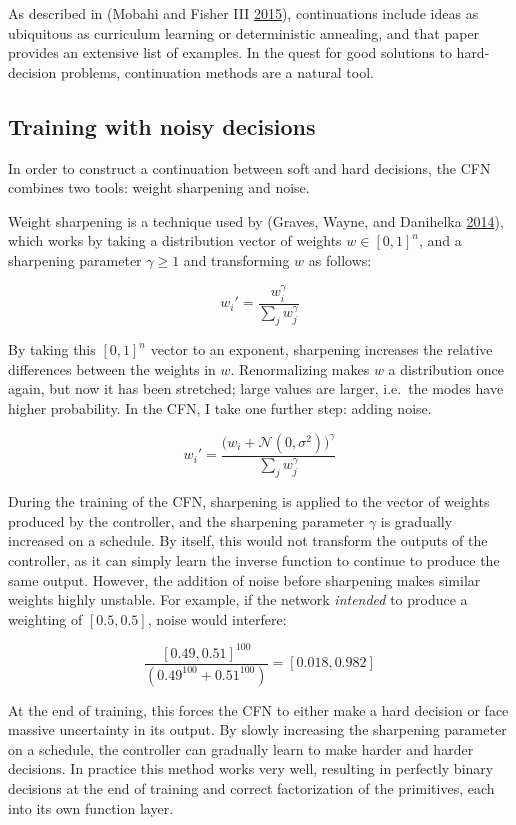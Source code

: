 \documentclass[12pt,twoside]{mitthesis}
\begin{document}
As described in (Mobahi and Fisher III
\protect\hyperlink{ref-mobahi2015theoretical}{2015}), continuations
include ideas as ubiquitous as curriculum learning or deterministic
annealing, and that paper provides an extensive list of examples. In the
quest for good solutions to hard-decision problems, continuation methods
are a natural tool.

\subsection{Training with noisy
decisions}\label{training-with-noisy-decisions}

In order to construct a continuation between soft and hard decisions,
the CFN combines two tools: weight sharpening and noise.

Weight sharpening is a technique used by (Graves, Wayne, and Danihelka
\protect\hyperlink{ref-graves2014neural}{2014}), which works by taking a
distribution vector of weights $w \in [0,1]^n$, and a sharpening
parameter $\gamma \ge 1$ and transforming $w$ as follows:

\[w_i' = \frac{w_i^{\gamma}}{\sum_j w_j^{\gamma}}\]

By taking this $[0,1]^n$ vector to an exponent, sharpening increases
the relative differences between the weights in $w$. Renormalizing
makes $w$ a distribution once again, but now it has been stretched;
large values are larger, i.e.~the modes have higher probability. In the
CFN, I take one further step: adding noise.

\[w_i' = \frac{\big(w_i + \mathcal{N}(0, \sigma^2)\big)^{\gamma}}{\sum_j w_j^{\gamma}}\]

During the training of the CFN, sharpening is applied to the vector of
weights produced by the controller, and the sharpening parameter
$\gamma$ is gradually increased on a schedule. By itself, this would
not transform the outputs of the controller, as it can simply learn the
inverse function to continue to produce the same output. However, the
addition of noise before sharpening makes similar weights highly
unstable. For example, if the network \emph{intended} to produce a
weighting of $[0.5, 0.5]$, noise would interfere:

\[\frac{[0.49, 0.51]^{100}}{(0.49^{100} + 0.51^{100})} = [0.018, 0.982]\]

At the end of training, this forces the CFN to either make a hard
decision or face massive uncertainty in its output. By slowly increasing
the sharpening parameter on a schedule, the controller can gradually
learn to make harder and harder decisions. In practice this method works
very well, resulting in perfectly binary decisions at the end of
training and correct factorization of the primitives, each into its own
function layer.
\end{document}
